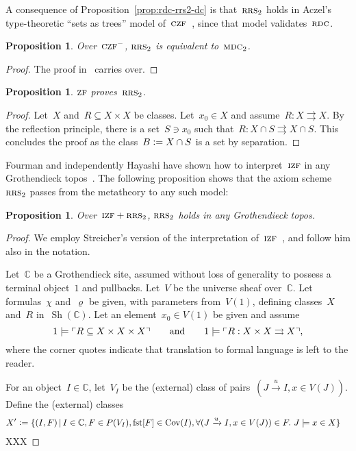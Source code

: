 \documentclass[oneside,reqno]{amsart}
\theoremstyle{definition}
\theoremstyle{plain}
\newtheorem{prop}[defn]{Proposition}
\theoremstyle{remark}
\newcommand{\CC}{\mathbb{C}}
\newcommand{\defeq}{\vcentcolon=}
\DeclareMathOperator{\Sh}{Sh}
\renewcommand{\_}{\mathpunct{.}\,}
\newcommand{\?}{\,{:}\,}
\newcommand{\speak}[1]{\ulcorner\text{\textnormal{#1}}\urcorner}
\newcommand{\ZF}{\textsc{zf}}
\newcommand{\IZF}{\textsc{izf}}
\newcommand{\CZF}{\textsc{czf}}
\newcommand{\RRS}{\textsc{rrs}}
\newcommand{\RDC}{\textsc{rdc}}
\newcommand{\MDC}{\textsc{mdc}}
\begin{document}
A consequence of Proposition~\ref{prop:rdc-rrs2-dc} is that~$\RRS_2$ holds in
Aczel's type-theoretic ``sets as trees'' model
of~$\CZF$~\cite{aczel:sets-as-trees}, since that model validates~$\RDC$.

\begin{prop}Over~$\CZF^-$, $\RRS_2$ is equivalent to~$\MDC_2$.\end{prop}

\begin{proof}The proof in~\cite{palmgren:mdc} carries over.\end{proof}

\begin{prop}\label{prop:zf-rrs2}
$\ZF$ proves~$\RRS_2$.\end{prop}

\begin{proof}Let~$X$ and~$R \subseteq X \times X$ be classes. Let~$x_0 \in X$
and assume~$R : X \rightrightarrows X$. By the reflection principle, there is a
set~$S \ni x_0$ such that~$R : X \cap S \rightrightarrows X \cap S$. This
concludes the proof as the class~$B \defeq X \cap S$ is a set by separation.
\end{proof}

Fourman and independently Hayashi have shown how to interpret~$\IZF$ in any
Grothendieck topos~\cite{fourman:izf,hayashi:izf}. The following proposition
shows that the axiom scheme~$\RRS_2$ passes from the metatheory to any such
model:

\begin{prop}Over~$\IZF + \RRS_2$, $\RRS_2$ holds in any Grothendieck topos.
\end{prop}

\begin{proof}We employ Streicher's version of the interpretation
of~$\IZF$~\cite{streicher:forcizf}, and follow him also in the notation.

Let~$\CC$ be a Grothendieck site, assumed without loss of generality to possess
a terminal object~$1$ and pullbacks. Let~$V$ be the universe sheaf over~$\CC$. Let
formulas~$\chi$ and~$\varrho$ be given, with parameters from~$V(1)$, defining
classes~$X$ and~$R$ in~$\Sh(\CC)$. Let an element~$x_0 \in V(1)$ be given and assume
\[ 1 \models \speak{$R \subseteq X \times X \times X$} \qquad\text{and}\qquad
  1 \models \speak{$R : X \times X \rightrightarrows X$}, \]
where the corner quotes indicate that translation to formal language is left to
the reader.

For an object~$I \in \CC$, let~$V_I$ be the (external) class of pairs~$(J
\xrightarrow{u} I, x \in V(J))$. Define the (external) classes
\begin{align*}
  X' &\defeq \{ (I,F) \,|\, I \in \CC, F \in P(V_I), \mathrm{fst}[F] \in
  \mathrm{Cov}(I), \forall (J \xrightarrow{u} I, x \in V(J)) \in F\_ J \models x \in X \}
\end{align*}
XXX
\end{proof}
\end{document}

